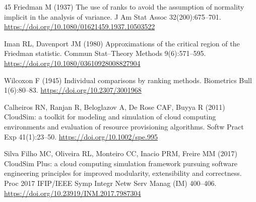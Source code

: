 \documentclass[pdflatex,onecolumn,sn-mathphys-num]{sn-jnl}
\begin{document}
\begin{thebibliography}{45}
Friedman M (1937) The use of ranks to avoid the assumption of normality implicit in the analysis of variance. J Am Stat Assoc 32(200):675--701. \url{https://doi.org/10.1080/01621459.1937.10503522}

Iman RL, Davenport JM (1980) Approximations of the critical region of the Friedman statistic. Commun Stat--Theory Methods 9(6):571--595. \url{https://doi.org/10.1080/03610928008827904}

Wilcoxon F (1945) Individual comparisons by ranking methods. Biometrics Bull 1(6):80--83. \url{https://doi.org/10.2307/3001968}

Calheiros RN, Ranjan R, Beloglazov A, De Rose CAF, Buyya R (2011) CloudSim: a toolkit for modeling and simulation of cloud computing environments and evaluation of resource provisioning algorithms. Softw Pract Exp 41(1):23--50. \url{https://doi.org/10.1002/spe.995}

Silva Filho MC, Oliveira RL, Monteiro CC, Inacio PRM, Freire MM (2017) CloudSim Plus: a cloud computing simulation framework pursuing software engineering principles for improved modularity, extensibility and correctness. Proc 2017 IFIP/IEEE Symp Integr Netw Serv Manag (IM) 400--406. \url{https://doi.org/10.23919/INM.2017.7987304}
\end{thebibliography}
\end{document}
